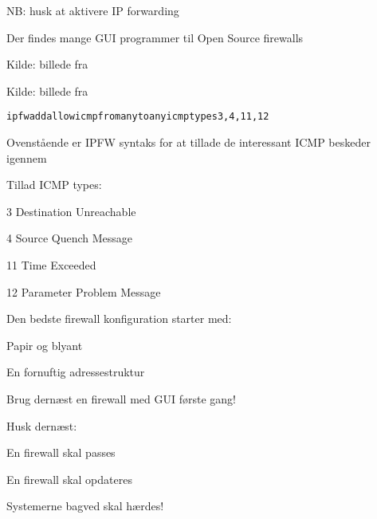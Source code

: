 \centerline{NB: husk at aktivere IP forwarding}



\begin{list1}
\item Der findes mange GUI programmer til Open Source firewalls
\end{list1}

Kilde: billede fra 




Kilde: billede fra 



\begin{alltt}
ipfw add allow icmp from any to any icmptypes 3,4,11,12
\end{alltt}

\begin{list1}
\item Ovenstående er IPFW syntaks for at tillade de interessant ICMP beskeder igennem
\item Tillad ICMP types:
\begin{list2}
\item 3 Destination Unreachable
\item 4 Source Quench Message
\item 11 Time Exceeded
\item 12 Parameter Problem Message
\end{list2}
\end{list1}


\begin{list1}
\item Den bedste firewall konfiguration starter med:
\begin{list2}
\item Papir og blyant
\item En fornuftig adressestruktur
\end{list2}
\item Brug dernæst en firewall med GUI første gang!
\item Husk dernæst:
\begin{list2}
\item En firewall skal passes
\item En firewall skal opdateres
\item Systemerne bagved skal hærdes!    
\end{list2}
\end{list1}

